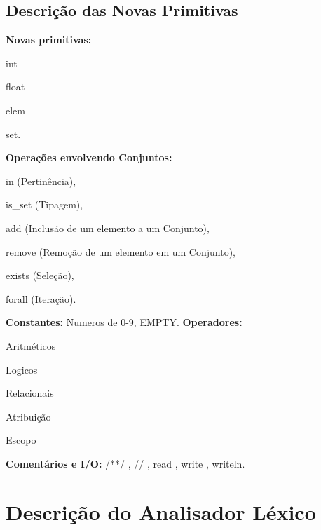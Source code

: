 \documentclass[runningheads]{llncs}
\begin{document}
\subsection{Descrição das Novas Primitivas}
\textbf{Novas primitivas:}
\begin{enumerate*}
    \item int
    \item float
    \item elem
    \item set.
\end{enumerate*}
\newline
\textbf{Operações envolvendo Conjuntos:}
\begin{enumerate*}
    \item in (Pertinência),
    \item is\_set (Tipagem),
    \item add (Inclusão de um elemento a um Conjunto),
    \item remove (Remoção de um elemento em um Conjunto),
    \item exists (Seleção),
    \item forall (Iteração).
\end{enumerate*}
\newline
\textbf{Constantes:} Numeros de 0-9, EMPTY.
\newline
\textbf{Operadores:}
\begin{enumerate*}
    \item Aritméticos
    \item Logicos
    \item Relacionais
    \item Atribuição 
    \item Escopo
\end{enumerate*}
\newline
\textbf{Comentários e I/O:}  /**/ , // , read , write , writeln.
\section{Descrição do Analisador Léxico}
\end{document}
